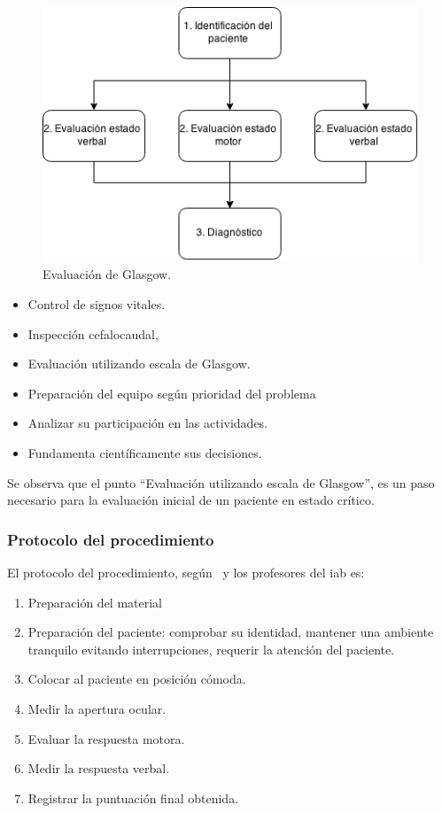 \begin{figure}
\centering
\includegraphics[scale=0.5]{requerimientos/images/glasgow.png}
\caption{Evaluación de Glasgow.}
\label{fig:proc_glasgow}
\end{figure}

\begin{itemize}
\item Control de signos vitales.
\item Inspección cefalocaudal, 
\item Evaluación utilizando escala de Glasgow.
\item Preparación del equipo según prioridad del problema
\item Analizar su participación en las actividades.
\item Fundamenta científicamente sus decisiones.
\end{itemize}

Se observa que el punto \enquote{Evaluación utilizando escala de Glasgow}, es un
paso necesario para la evaluación inicial de un paciente en estado crítico.

\subsubsection{Protocolo del procedimiento}
\label{sec:glasgow_protocolo}

El protocolo del procedimiento, según~\cite{protocolo} y los profesores del \Gls{iab}
es:

\begin{enumerate}
\item Preparación del material
\item Preparación del paciente: comprobar su identidad, mantener una ambiente
    tranquilo evitando interrupciones, requerir la atención del paciente.
\item Colocar al paciente en posición cómoda.
\item Medir la apertura ocular.
\item Evaluar la respuesta motora.
\item Medir la respuesta verbal.
\item Registrar la puntuación final obtenida.
\end{enumerate}
